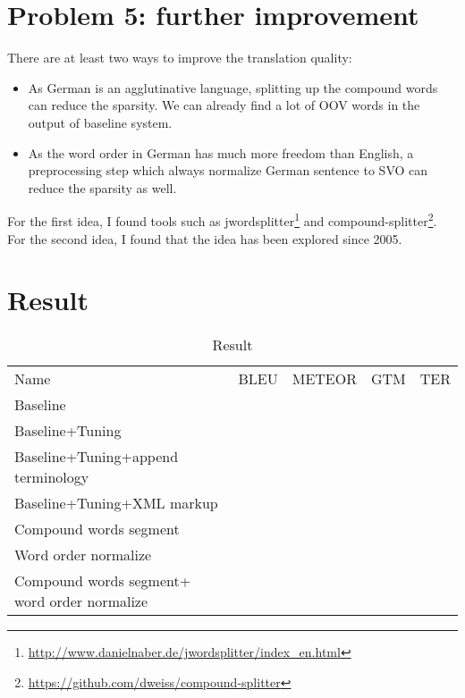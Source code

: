 \documentclass[a4paper]{article}
\begin{document}
\section{Problem 5: further improvement}
There are at least two ways to improve the translation quality:
\begin{itemize}
    \item As German is an agglutinative language, splitting up the compound words can reduce the sparsity. We can already find a lot of OOV words in the output of baseline system.
    \item As the word order in German has much more freedom than English, a preprocessing step which always normalize German sentence to SVO can reduce the sparsity as well.
\end{itemize}
For the first idea, I found tools such as jwordsplitter\footnote{\url{http://www.danielnaber.de/jwordsplitter/index_en.html}} and compound-splitter\footnote{\url{https://github.com/dweiss/compound-splitter}}. 
For the second idea, I found that the idea has been explored since 2005.


\section{Result}
\begin{table}
    \centering
    \begin{tabular}{l|r|r|r|r}
        Name & BLEU & METEOR & GTM & TER \\
        Baseline & & & & \\
        Baseline+Tuning & & & & \\
        Baseline+Tuning+append terminology & & & & \\
        Baseline+Tuning+XML markup & & & & \\
        Compound words segment& & & &\\
        Word order normalize & & & &\\
        Compound words segment+ word order normalize & & & &\\
    \end{tabular}
    \caption{Result}
    \label{tab:result}
\end{table}
\end{document}

